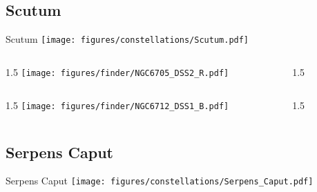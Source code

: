 \documentclass[final]{beamer}
\newlength{\colwidth}
\begin{document}
\subsection{Scutum}

\begin{frame}[t]{\LARGE Scutum}
  \centering
  \texttt{[image: figures/constellations/Scutum.pdf]}
\end{frame}


\begin{frame}[t]{}
  \begin{columns}[T]
    \begin{column}{1.5\colwidth}
      \centering
      \texttt{[image: figures/finder/NGC6705\_DSS2\_R.pdf]}
    \end{column}
    \begin{column}{1.5\colwidth}
      \Large
      
    \end{column}
  \end{columns}
  \vspace{\fill}
  \begin{columns}[T]
    \begin{column}{1.5\colwidth}
      \centering
      \texttt{[image: figures/finder/NGC6712\_DSS1\_B.pdf]}
    \end{column}
    \begin{column}{1.5\colwidth}
      \Large
      
    \end{column}
  \end{columns}
\end{frame}

\subsection{Serpens Caput}

\begin{frame}[t]{\LARGE Serpens Caput}
  \centering
  \texttt{[image: figures/constellations/Serpens\_Caput.pdf]}
\end{frame}

\end{document}
